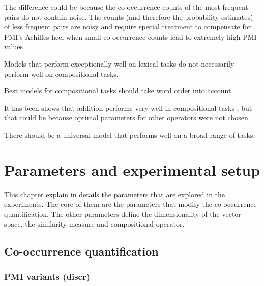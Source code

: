 The difference could be because the co-occurrence counts of the most frequent pairs do not contain noise. The counts (and therefore the probability estimates) of less frequent pairs are noisy and require special treatment to compensate for PMI's Achilles heel when small co-occurrence counts lead to extremely high PMI values \cite{TACL570}.

\begin{hyp}
\label{hyp:lextocomp}
Models that perform exceptionally well on lexical tasks do not necessarily perform well on compositional tasks.
\end{hyp}

\begin{hyp}
\label{hyp:order}
Best models for compositional tasks should take word order into account.
\end{hyp}

It has been shows that addition performs very well in compositional tasks \cite{milajevs-EtAl:2014:EMNLP2014}, but that could be because optimal parameters for other operators were not chosen.

\begin{hyp}
\label{hyp:universal}
There should be a universal model that performs well on a broad range of tasks.
\end{hyp}


\chapter{Parameters and experimental setup}
\label{sec:parameters}

This chapter explain in details the parameters that are explored in the experiments. The core of them are the parameters that modify the co-occurrence quantification. The other parameters define the dimensionality of the vector space, the similarity measure and compositional operator.

\section{Co-occurrence quantification}
\label{sec:quantification}

\subsection{PMI variants (discr)}
\label{sec:pmi-variants}

